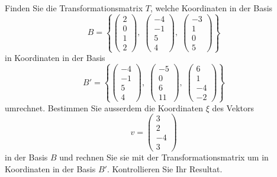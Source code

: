 Finden Sie die Transformationsmatrix $T$, welche Koordinaten in der Basis
\[
B=\left\{
\begin{pmatrix}
2\\0\\1\\2
\end{pmatrix},\;
\begin{pmatrix}
-4\\-1\\5\\4
\end{pmatrix},\;
\begin{pmatrix}
-3\\1\\0\\5
\end{pmatrix}
\right\}
\]
in Koordinaten in der Basis
\[
B'=\left\{
\begin{pmatrix}
-4\\-1\\5\\4
\end{pmatrix},\;
\begin{pmatrix}
-5\\0\\6\\11
\end{pmatrix},\;
\begin{pmatrix}
6\\1\\-4\\-2
\end{pmatrix}
\right\}
\]
umrechnet.
Bestimmen Sie ausserdem die Koordinaten $\xi$ des Vektors 
\[
v
=
\begin{pmatrix}
3\\2\\-4\\3
\end{pmatrix}
\]
in der Basis $B$ und rechnen Sie sie mit der Transformationsmatrix um in
Koordinaten in der Basis $B'$. Kontrollieren Sie Ihr Resultat.

